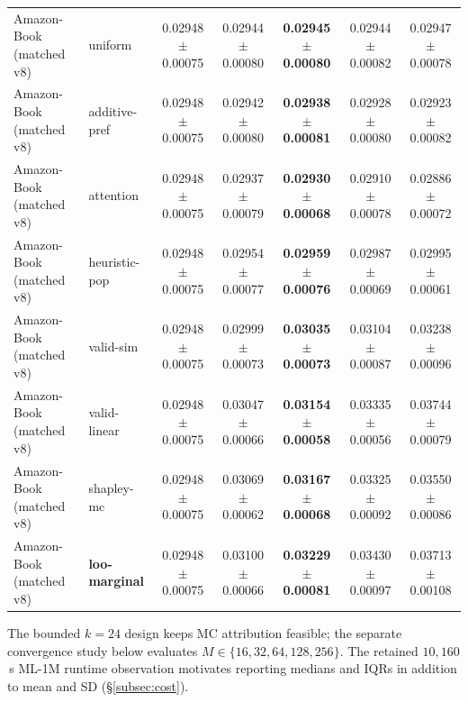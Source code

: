 \documentclass[pdflatex,sn-mathphys-num]{sn-jnl}
\begin{document}
\begin{table}[t]
{\begin{tabular}{llccccc}
Amazon-Book (matched v8) & uniform & 0.02948 $\pm$ 0.00075 & 0.02944 $\pm$ 0.00080 & \textbf{0.02945 $\pm$ 0.00080} & 0.02944 $\pm$ 0.00082 & 0.02947 $\pm$ 0.00078 \\
Amazon-Book (matched v8) & additive-pref & 0.02948 $\pm$ 0.00075 & 0.02942 $\pm$ 0.00080 & \textbf{0.02938 $\pm$ 0.00081} & 0.02928 $\pm$ 0.00080 & 0.02923 $\pm$ 0.00082 \\
Amazon-Book (matched v8) & attention & 0.02948 $\pm$ 0.00075 & 0.02937 $\pm$ 0.00079 & \textbf{0.02930 $\pm$ 0.00068} & 0.02910 $\pm$ 0.00078 & 0.02886 $\pm$ 0.00072 \\
Amazon-Book (matched v8) & heuristic-pop & 0.02948 $\pm$ 0.00075 & 0.02954 $\pm$ 0.00077 & \textbf{0.02959 $\pm$ 0.00076} & 0.02987 $\pm$ 0.00069 & 0.02995 $\pm$ 0.00061 \\
Amazon-Book (matched v8) & valid-sim & 0.02948 $\pm$ 0.00075 & 0.02999 $\pm$ 0.00073 & \textbf{0.03035 $\pm$ 0.00073} & 0.03104 $\pm$ 0.00087 & 0.03238 $\pm$ 0.00096 \\
Amazon-Book (matched v8) & valid-linear & 0.02948 $\pm$ 0.00075 & 0.03047 $\pm$ 0.00066 & \textbf{0.03154 $\pm$ 0.00058} & 0.03335 $\pm$ 0.00056 & 0.03744 $\pm$ 0.00079 \\
Amazon-Book (matched v8) & shapley-mc & 0.02948 $\pm$ 0.00075 & 0.03069 $\pm$ 0.00062 & \textbf{0.03167 $\pm$ 0.00068} & 0.03325 $\pm$ 0.00092 & 0.03550 $\pm$ 0.00086 \\
Amazon-Book (matched v8) & \textbf{loo-marginal} & 0.02948 $\pm$ 0.00075 & 0.03100 $\pm$ 0.00066 & \textbf{0.03229 $\pm$ 0.00081} & 0.03430 $\pm$ 0.00097 & 0.03713 $\pm$ 0.00108 \\
\bottomrule
\end{tabular}
}
\end{table}

The bounded $k=24$ design keeps MC attribution feasible; the separate convergence study below evaluates $M\in\{16,32,64,128,256\}$. The retained $10{,}160$\,s ML-1M runtime observation motivates reporting medians and IQRs in addition to mean and SD (\S\ref{subsec:cost}).
\end{document}
